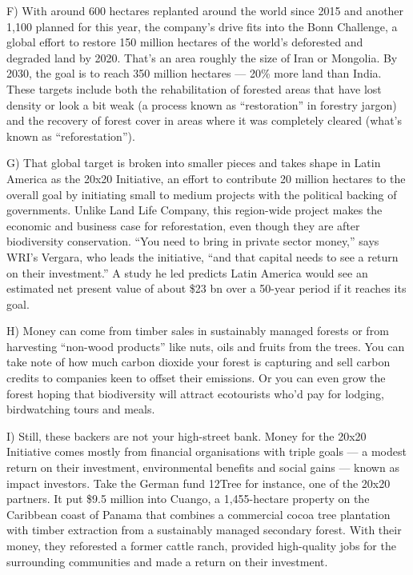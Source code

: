 \documentclass[UTF8,11pt]{ctexart}
\begin{document}
F) With around 600 hectares replanted around the world since 2015 and another 1,100 planned for this year, the company’s drive fits into the Bonn Challenge, a global effort to restore 150 million hectares of the world’s deforested and degraded land by 2020. That’s an area roughly the size of Iran or Mongolia. By 2030, the goal is to reach 350 million hectares — 20\% more land than India. These targets include both the rehabilitation of forested areas that have lost density or look a bit weak (a process known as “restoration” in forestry jargon) and the recovery of forest cover in areas where it was completely cleared (what’s known as “reforestation”).


G) That global target is broken into smaller pieces and takes shape in Latin America as the 20x20 Initiative, an effort to contribute 20 million hectares to the overall goal by initiating small to medium projects with the political backing of governments. Unlike Land Life Company, this region-wide project makes the economic and business case for reforestation, even though they are after biodiversity conservation. “You need to bring in private sector money,” says WRI’s Vergara, who leads the initiative, “and that capital needs to see a return on their investment.” A study he led predicts Latin America would see an estimated net present value of about \$23 bn over a 50-year period if it reaches its goal.


H) Money can come from timber sales in sustainably managed forests or from harvesting “non-wood products” like nuts, oils and fruits from the trees. You can take note of how much carbon dioxide your forest is capturing and sell carbon credits to companies keen to offset their emissions. Or you can even grow the forest hoping that biodiversity will attract ecotourists who’d pay for lodging, birdwatching tours and meals.


I) Still, these backers are not your high-street bank. Money for the 20x20 Initiative comes mostly from financial organisations with triple goals — a modest return on their investment, environmental benefits and social gains — known as impact investors. Take the German fund 12Tree for instance, one of the 20x20 partners. It put \$9.5 million into Cuango, a 1,455-hectare property on the Caribbean coast of Panama that combines a commercial cocoa tree plantation with timber extraction from a sustainably managed secondary forest. With their money, they reforested a former cattle ranch, provided high-quality jobs for the surrounding communities and made a return on their investment.
\end{document}
